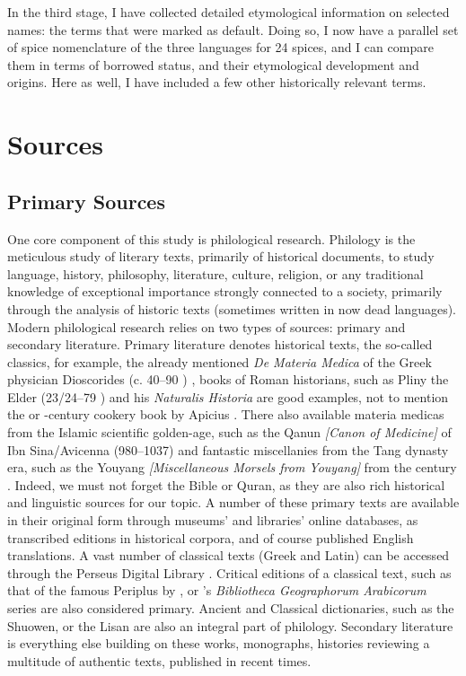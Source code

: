 In the third stage, I have collected detailed etymological information on selected names: the terms that were marked as default. Doing so, I now have a parallel set of spice nomenclature of the three languages for 24 spices, and I can compare them in terms of borrowed status, and their etymological development and origins. Here as well, I have included a few other historically relevant terms.

\section{Sources}

\subsection{Primary Sources}

One core component of this study is philological research. Philology is the meticulous study of literary texts, primarily of historical documents, to study language, history, philosophy, literature, culture, religion, or any traditional knowledge of exceptional importance strongly connected to a society, primarily through the analysis of historic texts (sometimes written in now dead languages). Modern philological research relies on two types of sources: primary and secondary literature. Primary literature denotes historical texts, the so-called classics, for example, the already mentioned \textit{De Materia Medica} of the Greek physician Dioscorides (c. 40--90 \AD) \autocite{dioscorides_materia_2005}, books of Roman historians, such as Pliny the Elder (23/24--79 \AD) and his \textit{Naturalis Historia} \autocite{pliny_the_elder_natural_1855} are good examples, not to mention the or -century cookery book by Apicius \autocite{apicius_apicius_1977}. There also available \glspl{materia medica} from the Islamic scientific golden-age, such as the \gls{Qanun} \textit{[Canon of Medicine]} of Ibn Sina/Avicenna (980--1037) \autocite{ibn_sina_-qanun_1329} and fantastic miscellanies from the Tang dynasty era, such as the \gls{Youyang} \textit{[Miscellaneous Morsels from Youyang]} from the  century \autocite{yyzz}. Indeed, we must not forget the Bible or Quran, as they are also rich historical and linguistic sources for our topic. A number of these primary texts are available in their original form through museums' and libraries' online databases, as transcribed editions in historical corpora, and of course published English translations. A vast number of classical texts (Greek and Latin) can be accessed through the Perseus Digital Library \autocite{crane_perseus_nodate}. Critical editions of a classical text, such as that of the famous \gls{Periplus} by \textcite{casson_periplus_1989}, or \textcite{de_goeje_bibliotheca_1870}'s \textit{Bibliotheca Geographorum Arabicorum} series are also considered primary. Ancient and Classical dictionaries, such as the \gls{Shuowen}, or the \gls{Lisan} are also an integral part of philology. Secondary literature is everything else building on these works, monographs, histories reviewing a multitude of authentic texts, published in recent times.


